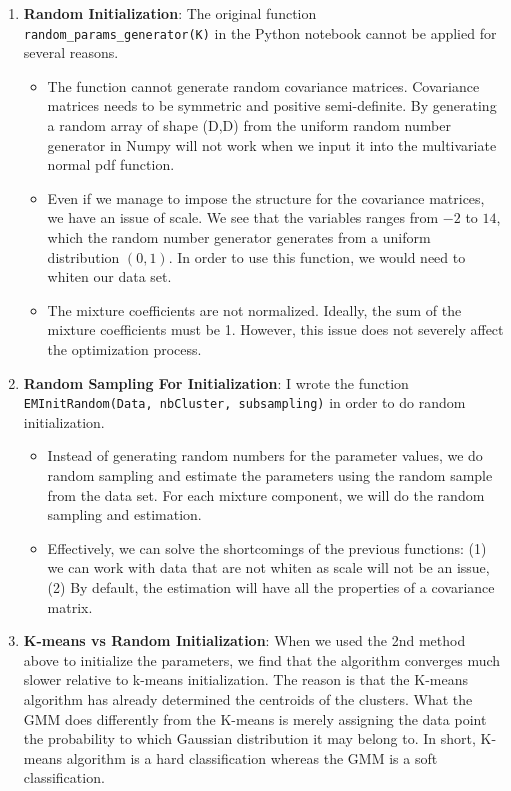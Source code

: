 \documentclass[12pt,twoside]{article}
\begin{document}
\begin{enumerate}
\item \textbf{Random Initialization}: The original function \texttt{random\_params\_generator(K)} in the Python notebook cannot be applied for several reasons.
	\begin{itemize}
		\item The function cannot generate random covariance matrices. Covariance matrices needs to be symmetric and positive semi-definite. By generating a random array of shape (D,D) from the uniform random number generator in Numpy will not work when we input it into the multivariate normal pdf function.
		\item Even if we manage to impose the structure for the covariance matrices, we have an issue of scale. We see that the variables ranges from $-2$ to $14$, which the random number generator generates from a uniform distribution $(0,1)$. In order to use this function, we would need to whiten our data set.
		\item The mixture coefficients are not normalized. Ideally, the sum of the mixture coefficients must be 1. However, this issue does not severely affect the optimization process.
	\end{itemize}

\item \textbf{Random Sampling For Initialization}: I wrote the function \texttt{EMInitRandom(Data, nbCluster, subsampling)} in order to do random initialization.
	\begin{itemize}
		\item Instead of generating random numbers for the parameter values, we do random sampling and estimate the parameters using the random sample from the data set. For each mixture component, we will 	do the random sampling and estimation.
		\item Effectively, we can solve the shortcomings of the previous functions: (1) we can work with data that are not whiten as scale will not be an issue, (2) By default, the estimation will have all the properties of a covariance matrix.
	\end{itemize}

\item \textbf{K-means vs Random Initialization}: When we used the 2nd  method above to initialize the parameters, we find that the algorithm converges much slower relative to k-means initialization. The reason is that the K-means algorithm has already determined the centroids of the clusters. What the GMM does differently from the K-means is merely assigning the data point the probability to which Gaussian distribution it may belong to. In short, K-means algorithm is a hard classification whereas the GMM is a soft classification.


\end{enumerate}
\end{document}
